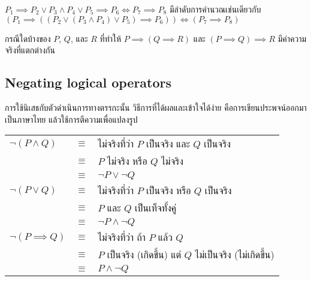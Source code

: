 \begin{example}
    $P_1\implies P_2\vee P_3\wedge P_4\vee P_5\implies P_6\iff P_7\implies P_8$ มีลำดับการคำนวณเช่นเดียวกับ $(P_1\implies ((P_2\vee (P_3\wedge P_4)\vee P_5)\implies P_6))\iff (P_7\implies P_8)$ 
\end{example}

\begin{exercise}
    กรณีใดบ้างของ $P$, $Q$, และ $R$ ที่ทำให้ $P\implies(Q\implies R)$ และ $(P\implies Q)\implies R$ มีค่าความจริงที่แตกต่างกัน
\end{exercise}

\subsection{Negating logical operators}
การใช้นิเสธกับตัวดำเนินการทางตรรกะนั้น วิธีการที่ได้ผลและเข้าใจได้ง่าย คือการเขียนประพจน์ออกมาเป็นภาษาไทย แล้วใช้การตีความเพื่อแปลงรูป

\begin{tabular}{lcl}
$\neg (P\wedge Q)$ & $\equiv$ & ไม่จริงที่ว่า $P$ เป็นจริง และ $Q$ เป็นจริง \\
& $\equiv$ & $P$ ไม่จริง หรือ $Q$ ไม่จริง \\
& $\equiv$ & $\neg P\vee\neg Q$ \\
%
$\neg (P\vee Q)$ & $\equiv$ & ไม่จริงที่ว่า $P$ เป็นจริง หรือ $Q$ เป็นจริง \\
& $\equiv$ & $P$ และ $Q$ เป็นเท็จทั้งคู่ \\
& $\equiv$ & $\neg P\wedge\neg Q$ \\
%
$\neg (P\implies Q)$ & $\equiv$ & ไม่จริงที่ว่า ถ้า $P$ แล้ว $Q$ \\
& $\equiv$ & $P$ เป็นจริง (เกิดขึ้น) แต่ $Q$ ไม่เป็นจริง (ไม่เกิดขึ้น) \\
& $\equiv$ & $P\wedge\neg Q$
\end{tabular}
